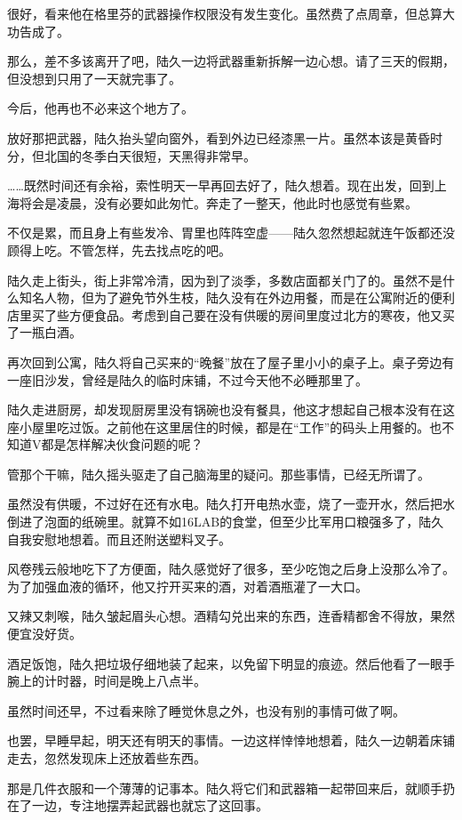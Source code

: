 很好，看来他在格里芬的武器操作权限没有发生变化。虽然费了点周章，但总算大功告成了。

那么，差不多该离开了吧，陆久一边将武器重新拆解一边心想。请了三天的假期，但没想到只用了一天就完事了。

今后，他再也不必来这个地方了。

放好那把武器，陆久抬头望向窗外，看到外边已经漆黑一片。虽然本该是黄昏时分，但北国的冬季白天很短，天黑得非常早。

……既然时间还有余裕，索性明天一早再回去好了，陆久想着。现在出发，回到上海将会是凌晨，没有必要如此匆忙。奔走了一整天，他此时也感觉有些累。

不仅是累，而且身上有些发冷、胃里也阵阵空虚——陆久忽然想起就连午饭都还没顾得上吃。不管怎样，先去找点吃的吧。

陆久走上街头，街上非常冷清，因为到了淡季，多数店面都关门了的。虽然不是什么知名人物，但为了避免节外生枝，陆久没有在外边用餐，而是在公寓附近的便利店里买了些方便食品。考虑到自己要在没有供暖的房间里度过北方的寒夜，他又买了一瓶白酒。

再次回到公寓，陆久将自己买来的“晚餐”放在了屋子里小小的桌子上。桌子旁边有一座旧沙发，曾经是陆久的临时床铺，不过今天他不必睡那里了。

陆久走进厨房，却发现厨房里没有锅碗也没有餐具，他这才想起自己根本没有在这座小屋里吃过饭。之前他在这里居住的时候，都是在“工作”的码头上用餐的。也不知道V都是怎样解决伙食问题的呢？

管那个干嘛，陆久摇头驱走了自己脑海里的疑问。那些事情，已经无所谓了。

虽然没有供暖，不过好在还有水电。陆久打开电热水壶，烧了一壶开水，然后把水倒进了泡面的纸碗里。就算不如16LAB的食堂，但至少比军用口粮强多了，陆久自我安慰地想着。而且还附送塑料叉子。

风卷残云般地吃下了方便面，陆久感觉好了很多，至少吃饱之后身上没那么冷了。为了加强血液的循环，他又拧开买来的酒，对着酒瓶灌了一大口。

又辣又刺喉，陆久皱起眉头心想。酒精勾兑出来的东西，连香精都舍不得放，果然便宜没好货。

酒足饭饱，陆久把垃圾仔细地装了起来，以免留下明显的痕迹。然后他看了一眼手腕上的计时器，时间是晚上八点半。

虽然时间还早，不过看来除了睡觉休息之外，也没有别的事情可做了啊。

也罢，早睡早起，明天还有明天的事情。一边这样悻悻地想着，陆久一边朝着床铺走去，忽然发现床上还放着些东西。

那是几件衣服和一个薄薄的记事本。陆久将它们和武器箱一起带回来后，就顺手扔在了一边，专注地摆弄起武器也就忘了这回事。

